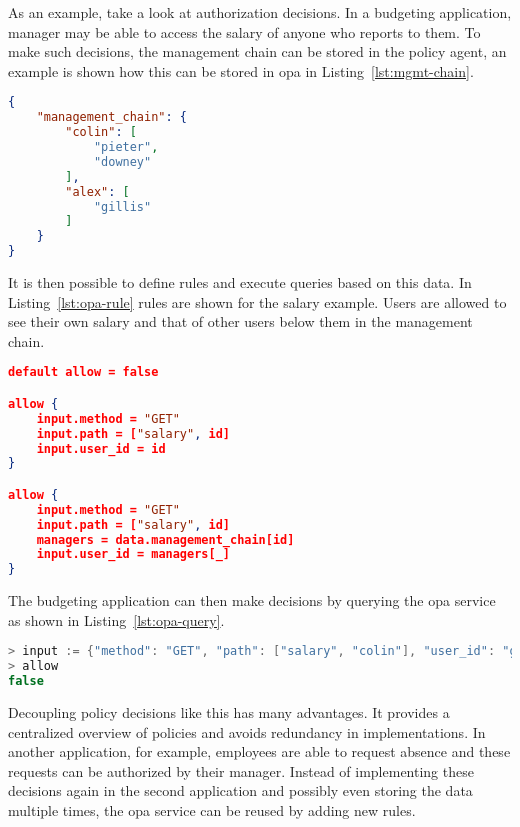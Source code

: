 As an example, take a look at authorization decisions.
In a budgeting application, manager may be able to access the salary of anyone who reports to them.
To make such decisions, the management chain can be stored in the policy agent, an example is shown how this can be stored in \gls{opa} in Listing~\ref{lst:mgmt-chain}.

\begin{lstlisting}[language={json},caption={Management chain data example for use in OPA.},label={lst:mgmt-chain},xleftmargin=15pt]
{
    "management_chain": {
        "colin": [
            "pieter",
            "downey"
        ],
        "alex": [
            "gillis"
        ]
    }
}
\end{lstlisting}

It is then possible to define rules and execute queries based on this data.
In Listing~\ref{lst:opa-rule} rules are shown for the salary example.
Users are allowed to see their own salary and that of other users below them in the management chain.


\begin{minipage}[t]{0.9\linewidth}
\begin{lstlisting}[language={json},caption={OPA rules that define who has access to the salary of other users.},label={lst:opa-rule},xleftmargin=15pt]
default allow = false

allow {
    input.method = "GET"
    input.path = ["salary", id]
    input.user_id = id
}

allow {
    input.method = "GET"
    input.path = ["salary", id]
    managers = data.management_chain[id]
    input.user_id = managers[_]
}
\end{lstlisting}
\end{minipage}

The budgeting application can then make decisions by querying the \gls{opa} service as shown in Listing~\ref{lst:opa-query}.

\begin{minipage}[t]{0.9\linewidth}
\begin{lstlisting}[language={java},caption={Management chain data example for use in OPA.},label={lst:opa-query},xleftmargin=15pt]
> input := {"method": "GET", "path": ["salary", "colin"], "user_id": "gillis"}
> allow
false
\end{lstlisting}
\end{minipage}

Decoupling policy decisions like this has many advantages.
It provides a centralized overview of policies and avoids redundancy in implementations.
In another application, for example, employees are able to request absence and these requests can be authorized by their manager.
Instead of implementing these decisions again in the second application and possibly even storing the data multiple times, the \gls{opa} service can be reused by adding new rules.

